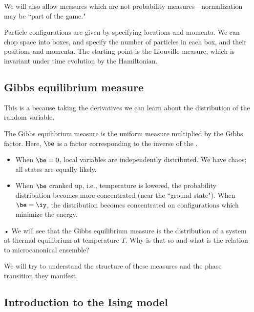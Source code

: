 \begin{enumerate}
We will also allow measures which are not probability measures---normalization may be ``part of the game."

Particle configurations are given by specifying locations and momenta. We can chop space into boxes, and specify the number of particles in each box, and their positions and momenta. The starting point is the Liouville measure, which is invariant under time evolution by the Hamiltonian.
\end{enumerate}

\subsection{Gibbs equilibrium measure}
This is a  because taking the derivatives we can learn about the distribution of the random variable.

The Gibbs equilibrium measure is the uniform measure %
multiplied by the Gibbs factor. Here, $\be$ is a factor corresponding to the inverse of the .

\begin{itemize}
\item
When $\be=0$, local variables are independently distributed. We have chaos; all states are equally likely.
\item
When $\be$ cranked up, i.e., temperature is lowered, the probability distribution becomes more concentrated (near the ``ground state"). When $\be=\iy$, the distribution becomes concentrated on configurations which minimize the energy.
\end{itemize}•
We will see that the Gibbs equilibrium measure is the distribution of a system at thermal equilibrium at temperature $T$. Why is that so and what is the relation to microcanonical ensemble?

We will try to understand the structure of these measures and the phase transition they manifest.

\subsection{Introduction to the Ising model}

